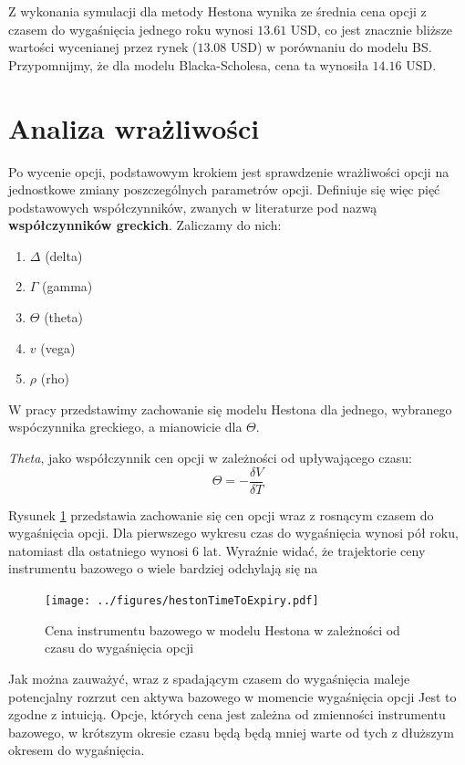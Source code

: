 \documentclass{pracamgr}
\begin{document}
Z wykonania symulacji dla metody Hestona wynika ze średnia cena opcji z czasem do wygaśnięcia jednego roku wynosi $13.61$ USD, co jest znacznie bliższe wartości wycenianej przez rynek ($13.08$ USD) w porównaniu do modelu BS. 
Przypomnijmy, że dla modelu Blacka-Scholesa, cena ta wynosiła $14.16$ USD.



\section{Analiza wrażliwości}

Po wycenie opcji, podstawowym krokiem jest sprawdzenie wrażliwości opcji na jednostkowe zmiany
poszczególnych parametrów opcji.
Definiuje się więc pięć podstawowych współczynników, zwanych w literaturze pod nazwą \textbf{współczynników greckich}.
Zaliczamy do nich:
\begin{enumerate}
  \item $\Delta$ (delta)
  \item $\Gamma$ (gamma)
  \item $\Theta$ (theta)
  \item $v$ (vega)
  \item $\rho$ (rho)
\end{enumerate}

W pracy przedstawimy zachowanie się modelu Hestona dla jednego, wybranego wspóczynnika greckiego, 
a mianowicie dla $\Theta$.

\textit{Theta}, jako współczynnik cen opcji w zależności od upływającego czasu:
\begin{equation}
  \Theta = - \frac{\delta V}{\delta T}
\end{equation}

Rysunek \ref{fig:hestonTimeToExpiry} przedstawia zachowanie się cen opcji wraz z rosnącym czasem do 
wygaśnięcia opcji. Dla pierwszego wykresu czas do wygaśnięcia wynosi pół roku, natomiast dla ostatniego 
wynosi 6 lat. Wyraźnie widać, że trajektorie ceny instrumentu bazowego o wiele bardziej odchylają się 
na 
\begin{figure}
  \texttt{[image: ../figures/hestonTimeToExpiry.pdf]}
  \caption{Cena instrumentu bazowego w modelu Hestona w zależności od czasu do wygaśnięcia opcji}
  \label{fig:hestonTimeToExpiry}
\end{figure}

Jak można zauważyć, wraz z spadającym czasem do wygaśnięcia maleje potencjalny rozrzut cen aktywa bazowego w momencie wygaśnięcia opcji
Jest to zgodne z intuicją. Opcje, których cena jest zależna od zmienności instrumentu bazowego, 
w krótszym okresie czasu będą będą mniej warte od tych z dłuższym okresem do wygaśnięcia.
\end{document}
